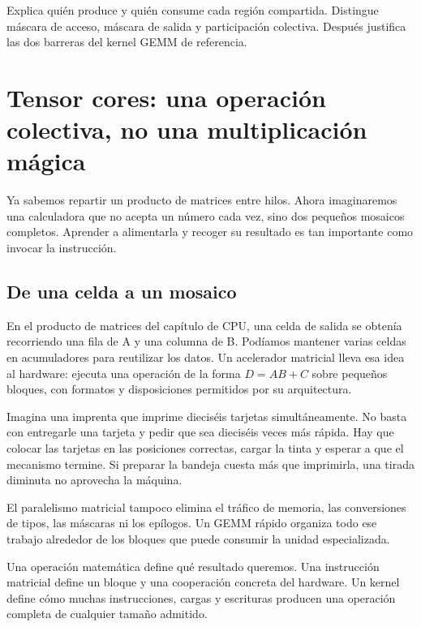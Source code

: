 \documentclass[12pt,a4paper,oneside]{report}
\begin{document}
\begin{comprueba}
Explica quién produce y quién consume cada región compartida. Distingue máscara de acceso, máscara de salida y participación colectiva. Después justifica las dos barreras del kernel GEMM de referencia.

\end{comprueba}

\chapter{Tensor cores: una operación colectiva, no una multiplicación mágica}
\label{ch:tensorcores}
\begin{idea}
Ya sabemos repartir un producto de matrices entre hilos. Ahora imaginaremos una calculadora que no acepta un número cada vez, sino dos pequeños mosaicos completos. Aprender a alimentarla y recoger su resultado es tan importante como invocar la instrucción.

\end{idea}
\section{De una celda a un mosaico}
En el producto de matrices del capítulo de CPU, una celda de salida se obtenía recorriendo una fila de A y una columna de B. Podíamos mantener varias celdas en acumuladores para reutilizar los datos. Un acelerador matricial lleva esa idea al hardware: ejecuta una operación de la forma $D=AB+C$ sobre pequeños bloques, con formatos y disposiciones permitidos por su arquitectura.

Imagina una imprenta que imprime dieciséis tarjetas simultáneamente. No basta con entregarle una tarjeta y pedir que sea dieciséis veces más rápida. Hay que colocar las tarjetas en las posiciones correctas, cargar la tinta y esperar a que el mecanismo termine. Si preparar la bandeja cuesta más que imprimirla, una tirada diminuta no aprovecha la máquina.

El paralelismo matricial tampoco elimina el tráfico de memoria, las conversiones de tipos, las máscaras ni los epílogos. Un GEMM rápido organiza todo ese trabajo alrededor de los bloques que puede consumir la unidad especializada.

\begin{definicion}
Una operación matemática define qué resultado queremos. Una instrucción matricial define un bloque y una cooperación concreta del hardware. Un kernel define cómo muchas instrucciones, cargas y escrituras producen una operación completa de cualquier tamaño admitido.

\end{definicion}
\end{document}
